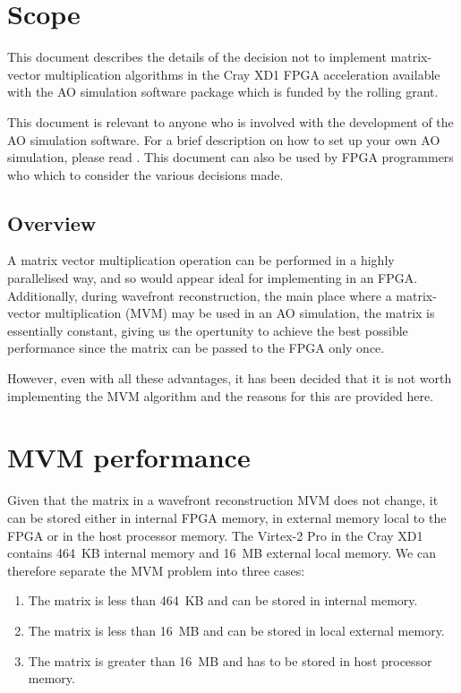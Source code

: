 \documentclass{article}
\begin{document}


\section{Scope}
This document describes the details of the decision not to implement
matrix-vector multiplication algorithms in the Cray XD1 FPGA
acceleration available with the AO simulation software package which
is funded by the rolling grant.

This document is relevant to anyone who is involved with the
development of the AO simulation software.  For a brief description on
how to set up your own AO simulation, please read \citet{dummies}.
This document can also be used by FPGA programmers who which to
consider the various decisions made.

\subsection{Overview}
A matrix vector multiplication operation can be performed in a highly
parallelised way, and so would appear ideal for implementing in an
FPGA.  Additionally, during wavefront reconstruction, the main place
where a matrix-vector multiplication (MVM) may be used in an AO
simulation, the matrix is essentially constant, giving us the
opertunity to achieve the best possible performance since the matrix
can be passed to the FPGA only once.  

However, even with all these advantages, it has been decided that it
is not worth implementing the MVM algorithm and the reasons for this
are provided here.

\section{MVM performance}
Given that the matrix in a wavefront reconstruction MVM does not
change, it can be stored either in internal FPGA memory, in external
memory local to the FPGA or in the host processor memory.  The
Virtex-2 Pro in the Cray XD1 contains 464~KB internal memory and 16~MB
external local memory.  We can therefore separate the MVM problem into
three cases:

\begin{enumerate}
\item The matrix is less than 464~KB and can be stored in internal
memory.
\item The matrix is less than 16~MB and can be stored in local
external memory.
\item The matrix is greater than 16~MB and has to be stored in host
processor memory.
\end{enumerate}
\end{document}
